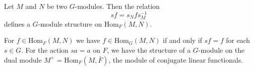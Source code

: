 Let $M$ and $N$ be two $G$-modules. Then the relation
$$sf = s_N f s_M^{-1}$$
defines a $G$-module structure on $\text{Hom}_F(M, N)$.

For $f \in \text{Hom}_F(M, N)$ we have $f \in \text{Hom}_G(M, N)$ if and only if $sf = f$ for each $s \in G$. For the action $sa = a$ on $F$, we have the structure of a $G$-module on the dual module $M^+ = \text{Hom}_F(M, \bar{F})$, the module of conjugate linear functionals.
